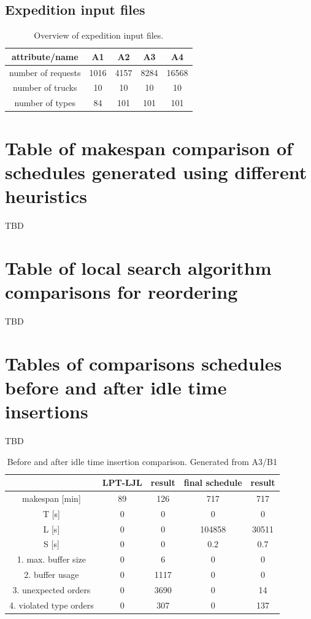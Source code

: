 \documentclass{ctuthesis}
\begin{document}
\section{Expedition input files}
\begin{table}[H]
\begin{tabular}{ |c| c c c c|} 
\hline
attribute/name & A1 & A2 & A3 & A4\\ 
\hline
number of requests & 1016 & 4157 & 8284 & 16568 \\
\hline
number of trucks & 10 & 10 & 10 & 10 \\ 
\hline
number of types & 84 & 101 & 101 & 101 \\ 
\hline
\end{tabular}
\caption{Overview of expedition input files.} \label{tab:in2}
\end{table}

\chapter{Table of makespan comparison of schedules generated using different heuristics }
TBD
\chapter{Table of local search algorithm comparisons for reordering}
TBD
\chapter{Tables of comparisons schedules before and after idle time insertions}
TBD
\begin{table}[H]
\begin{tabular}{ |c|| c | c | c | c |} 
\hline
 & LPT-LJL & result & final schedule & result \\ 
\hline
makespan [min] & 89 & 126 & 717 & 717 \\
\hline
T [s]& 0 & 0 & 0 & 0 \\
\hline
L [s]& 0 & 0 & 104858 & 30511 \\
\hline
S [s]& 0 & 0 & 0.2 & 0.7 \\
\hline
1. max. buffer size & 0 & 6 & 0 & 0\\ 
\hline
2. buffer usage  & 0 & 1117 & 0 & 0\\ 
\hline
3. unexpected orders & 0 & 3690 & 0 & 14\\ 
\hline
4. violated type orders & 0 & 307 & 0 & 137\\ 
\hline
\end{tabular}
\caption{Before and after idle time insertion comparison. Generated from A3/B1}
\end{table}
\end{document}
